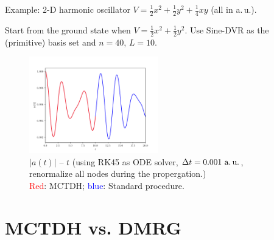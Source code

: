 \documentclass[12pt]{beamer}
\begin{document}
    \begin{frame}{Example: 2-D harmonic oscillator}
        \footnotesize
        $V = \frac{1}{2}x^2 + \frac{1}{2}y^2 + \frac{1}{4}xy$ (all in a.\,u.).
        
        Start from the ground state when $V = \frac{1}{2}x^2 + \frac{1}{2}y^2$. Use Sine-DVR as the (primitive) basis set and $n=40$, $L=10$.
        \begin{figure}
            \includegraphics[width=0.5\textwidth]{autocorr_MCTDH.pdf}
            \caption{$|a(t)|$ -- $t$ (using RK45 as ODE solver, $\Delta t = 0.001~\text{a.\,u.}$, renormalize all nodes during the propergation.)\\
            \footnotesize\textcolor{red}{Red}: MCTDH; \textcolor{blue}{blue}: Standard procedure.}
        \end{figure}
    \end{frame}


    \section{MCTDH vs. DMRG}
\end{document}
